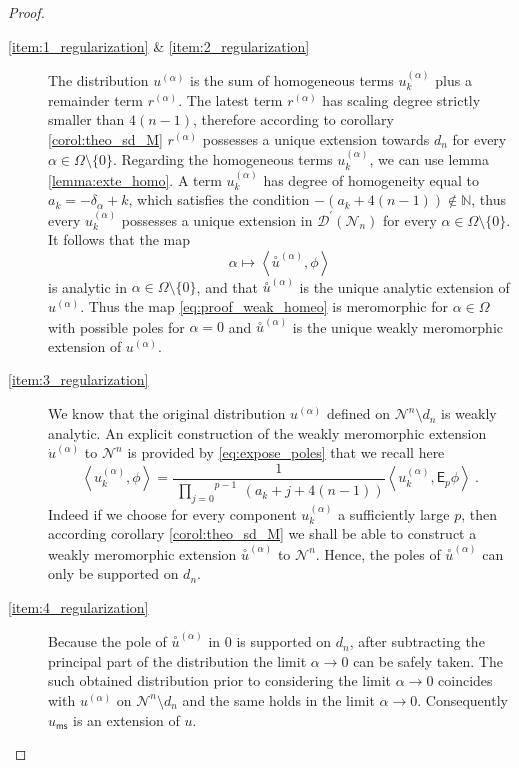 \documentclass[11pt]{book}
\newcommand{\ms}{\mathsf{ms}}
\newcommand{\sm}[1]{\left\langle#1\right\rangle}
\newcommand{\exte}[1]{\overset{\circ}{#1}}
\newcommand{\Dcal}{\mathcal{D}}
\newcommand{\Ncal}{\mathcal{N}}
\newcommand{\Nbb}{\mathbb{N}}
\newcommand{\Esf}{\mathsf{E}}
\theoremstyle{break}
\begin{document}
\begin{proof}
\begin{description}
%
%
\item[\ref{item:1_regularization} \& \ref{item:2_regularization}] The distribution $u^{(\alpha)}$ is the sum of homogeneous terms $u^{(\alpha)}_k$ plus a remainder term $r^{(\alpha)}$. The latest term $r^{(\alpha)}$ has scaling degree strictly smaller than $4(n-1)$, therefore according to corollary \ref{corol:theo_sd_M} $r^{(\alpha)}$ possesses a unique extension towards $d_n$ for every $\alpha \in \Omega \setminus \{0\}$. Regarding the homogeneous terms $u^{(\alpha)}_k$, we can use lemma \ref{lemma:exte_homo}. A term $u^{(\alpha)}_k$ has degree of homogeneity equal to $a_k = -\delta_\alpha + k$, which satisfies the condition $-\left(a_k+4(n-1)\right) \notin \Nbb$, thus every $u^{(\alpha)}_k$ possesses a unique extension in $\Dcal^\prime(\Ncal_n)$ for every $\alpha \in \Omega \setminus \{0\}$. It follows that the map
%
\begin{equation}
\alpha \mapsto \sm{\exte{u}^{(\alpha)} , \phi} 
\label{eq:proof_weak_homeo}
\end{equation}
%
is analytic in $\alpha \in \Omega \setminus \{0\}$, and that $\exte{u}^{(\alpha)}$ is the unique analytic extension of $u^{(\alpha)}$. Thus the map \eqref{eq:proof_weak_homeo} is meromorphic for $\alpha \in \Omega$ with possible poles for $\alpha=0$ and $\exte{u}^{(\alpha)}$ is the unique weakly meromorphic extension of $u^{(\alpha)}$.%
%
%
\item[\ref{item:3_regularization}] We know that the original distribution $u^{(\alpha)}$ defined on $\Ncal^n\setminus d_n$ is weakly analytic. An explicit construction of the weakly meromorphic extension $\dot{u}^{(\alpha)}$ to $\Ncal^n$ is provided by 
\eqref{eq:expose_poles} that we recall here%
%
\begin{equation*}%
\sm{ u^{(\alpha)}_k, \phi } = \frac{1}{\overset{p-1}{\ \underset{j=0}{\prod}} \ (a_k+j+4(n-1))}   \sm{ u^{(\alpha)}_k, \Esf_p \phi } \ .%
\end{equation*}%
%
Indeed if we choose for every component $u^{(\alpha)}_k$ a sufficiently large $p$, then according corollary \ref{corol:theo_sd_M} we shall be able to construct a weakly meromorphic extension $\exte{u}^{(\alpha)}$ to $\Ncal^n$. Hence, the poles of $\exte{u}^{(\alpha)}$ can only be supported on $d_n$.%
%
%
\item[\ref{item:4_regularization}] Because the pole of $\exte{u}^{(\alpha)}$ in $0$ is supported on $d_n$, after subtracting the principal part of the distribution the limit $\alpha \to 0$ can be safely taken. The such obtained distribution prior to considering the limit $\alpha \to 0$ coincides with $u^{(\alpha)}$ on $\Ncal^n\setminus d_n$ and the same holds in the limit $\alpha\to 0$. Consequently $u_\ms$ is an extension of $u$.\par%

\end{description}
\end{proof}
\end{document}
